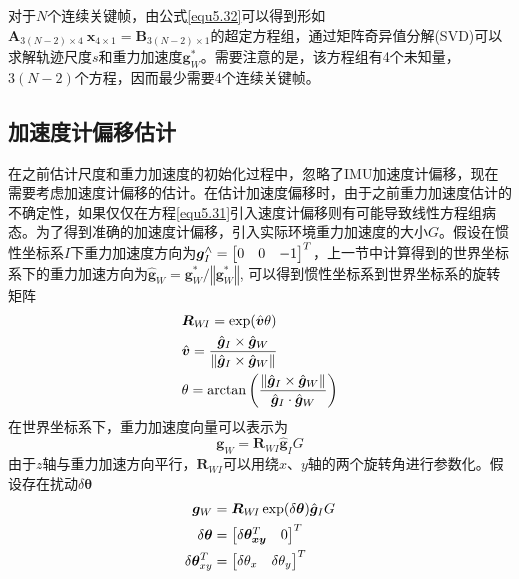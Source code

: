 对于$N$个连续关键帧，由公式\eqref{equ5.32}可以得到形如$\boldsymbol{A}_{3(N-2)\times4} \  \boldsymbol{x}_{4\times 1} = \boldsymbol{B}_{3(N-2)\times 1}$的超定方程组，通过矩阵奇异值分解(SVD)可以求解轨迹尺度$s$和重力加速度$\boldsymbol{g}_W^*$。需要注意的是，该方程组有4个未知量，$3(N-2)$个方程，因而最少需要4个连续关键帧。


\subsection{加速度计偏移估计}
在之前估计尺度和重力加速度的初始化过程中，忽略了IMU加速度计偏移，现在需要考虑加速度计偏移的估计。在估计加速度偏移时，由于之前重力加速度估计的不确定性，如果仅仅在方程\eqref{equ5.31}引入速度计偏移则有可能导致线性方程组病态。为了得到准确的加速度计偏移，引入实际环境重力加速度的大小$G$。假设在惯性坐标系$I$下重力加速度方向为$\boldsymbol{g}_I^{\wedge}= { \begin{bmatrix} 0 & 0 & -1 \cr  \end{bmatrix} ^T }$，上一节中计算得到的世界坐标系下的重力加速方向为$\hat{\boldsymbol{g}}_W = \boldsymbol{g}_W^* / \left\Vert \boldsymbol{g}_W^* \right\Vert$, 可以得到惯性坐标系到世界坐标系的旋转矩阵
\begin{equation}
\label{equ5.33}
\begin{aligned}
& \boldsymbol{R}_{W\!I} = \exp(\hat{\boldsymbol{v}} \theta)  \\ 
& \hat{\boldsymbol{v}} = { { \hat{\boldsymbol{g}}_I \times \hat{\boldsymbol{g}}_W } \over { \left\Vert \hat{\boldsymbol{g}}_I \times \hat{\boldsymbol{g}}_W   \right\Vert } }\\ 
& \theta = \arctan\left( {\left\Vert \hat{\boldsymbol{g}}_I \times \hat{\boldsymbol{g}}_W   \right\Vert \over \hat{\boldsymbol{g}}_I \cdot \hat{\boldsymbol{g}}_W }\right)
\end{aligned}
\end{equation}
在世界坐标系下，重力加速度向量可以表示为
\begin{equation}
\label{equ5.34}
\boldsymbol{g}_W = \boldsymbol{R}_{W\!I}\hat{\boldsymbol{g}}_IG
\end{equation}
由于$z$轴与重力加速方向平行，$\boldsymbol{R}_{W\!I}$可以用绕$x$、$y$轴的两个旋转角进行参数化。假设存在扰动$\delta \boldsymbol{\theta}$
\begin{equation}
\label{equ5.35}
\begin{aligned}
\boldsymbol{g}_W & = \boldsymbol{R}_{W\!I} \exp (\delta \boldsymbol{\theta}) \hat{\boldsymbol{g}}_I G 
\\ 
\delta \boldsymbol{\theta} &=
\begin{bmatrix}
\delta \boldsymbol{\theta_{xy}}^T & 0 \cr
\end{bmatrix}^T
\\
\delta \boldsymbol{\theta}_{xy}^T &= 
\begin{bmatrix}
\delta \theta_x & \delta \theta_y \cr
\end{bmatrix}^T
\end{aligned}
\end{equation}
